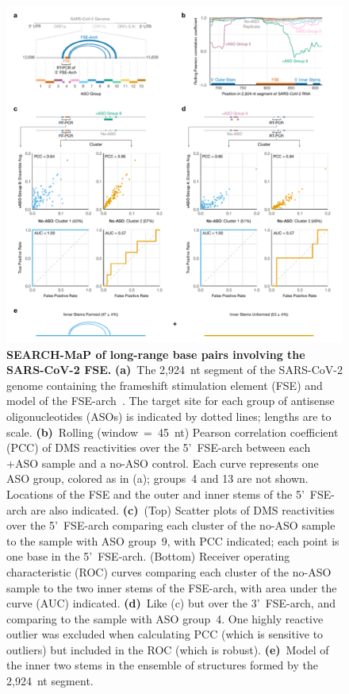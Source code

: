 \documentclass[main.tex]{subfiles}
\begin{document}
\begin{figure}[H]
	\includegraphics[width=\textwidth]{../MainFigures/sars2-tile/sars2-tile.pdf}
	\caption{\textbf{SEARCH-MaP of long-range base pairs involving the SARS-CoV-2 FSE.} \textbf{(a)}~The 2,924~nt segment of the SARS-CoV-2 genome containing the frameshift stimulation element (FSE) and model of the FSE-arch~\cite{Ziv2020}. The target site for each group of antisense oligonucleotides (ASOs) is indicated by dotted lines; lengths are to scale. \textbf{(b)}~Rolling (window~=~45~nt) Pearson correlation coefficient (PCC) of DMS reactivities over the 5'~FSE-arch between each +ASO sample and a no-ASO control. Each curve represents one ASO group, colored as in (a); groups~4 and 13 are not shown. Locations of the FSE and the outer and inner stems of the 5'~FSE-arch are also indicated. \textbf{(c)}~(Top) Scatter plots of DMS reactivities over the 5'~FSE-arch comparing each cluster of the no-ASO sample to the sample with ASO group~9, with PCC indicated; each point is one base in the 5'~FSE-arch. (Bottom) Receiver operating characteristic (ROC) curves comparing each cluster of the no-ASO sample to the two inner stems of the FSE-arch, with area under the curve (AUC) indicated. \textbf{(d)}~Like (c) but over the 3'~FSE-arch, and comparing to the sample with ASO group~4. One highly reactive outlier was excluded when calculating PCC (which is sensitive to outliers) but included in the ROC (which is robust). \textbf{(e)}~Model of the inner two stems in the ensemble of structures formed by the 2,924~nt segment.}
	\label{tiles}
\end{figure}
\end{document}
